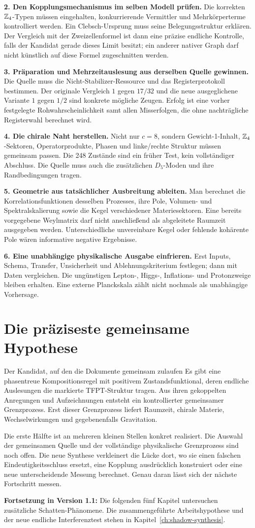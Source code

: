 \textbf{2. Den Kopplungsmechanismus im selben Modell prüfen.} Die korrekten $\mathbb Z_4$-Typen müssen eingehalten, konkurrierende Vermittler und Mehrkörperterme kontrolliert werden. Ein Clebsch-Ursprung muss seine Belegungsstruktur erklären. Der Vergleich mit der Zweizellenformel ist dann eine präzise endliche Kontrolle, falls der Kandidat gerade dieses Limit besitzt; ein anderer nativer Graph darf nicht künstlich auf diese Formel zugeschnitten werden.

\textbf{3. Präparation und Mehrzeitauslesung aus derselben Quelle gewinnen.} Die Quelle muss die Nicht-Stabilizer-Ressource und das Registerprotokoll bestimmen. Der originale Vergleich $1$ gegen $17/32$ und die neue ausgeglichene Variante $1$ gegen $1/2$ sind konkrete mögliche Zeugen. Erfolg ist eine vorher festgelegte Rohwahrscheinlichkeit samt allen Misserfolgen, die ohne nachträgliche Registerwahl berechnet wird.

\textbf{4. Die chirale Naht herstellen.} Nicht nur $c=8$, sondern Gewicht-1-Inhalt, $\mathbb Z_4$-Sektoren, Operatorprodukte, Phasen und linke/rechte Struktur müssen gemeinsam passen. Die 248 Zustände sind ein früher Test, kein vollständiger Abschluss. Die Quelle muss auch die zusätzlichen $D_5$-Moden und ihre Randbedingungen tragen.

\textbf{5. Geometrie aus tatsächlicher Ausbreitung ableiten.} Man berechnet die Korrelationsfunktionen desselben Prozesses, ihre Pole, Volumen- und Spektralskalierung sowie die Kegel verschiedener Materiesektoren. Eine bereits vorgegebene Weylmatrix darf nicht anschließend als abgeleitete Raumzeit ausgegeben werden. Unterschiedliche unvereinbare Kegel oder fehlende kohärente Pole wären informative negative Ergebnisse.

\textbf{6. Eine unabhängige physikalische Ausgabe einfrieren.} Erst Inputs, Schema, Transfer, Unsicherheit und Ablehnungskriterium festlegen; dann mit Daten vergleichen. Die ungünstigen Lepton-, Higgs-, Inflations- und Protonzweige bleiben erhalten. Eine externe Planckskala zählt nicht nochmals als unabhängige Vorhersage.

\section{Die präziseste gemeinsame Hypothese}
\begin{bild}{Der Kandidat, auf den die Dokumente gemeinsam zulaufen}
Es gibt eine phasentreue Kompositionsregel mit positivem Zustandsfunktional, deren endliche Auslesungen die markierte TFPT-Struktur tragen. Aus ihren gekoppelten Anregungen und Aufzeichnungen entsteht ein kontrollierter gemeinsamer Grenzprozess. Erst dieser Grenzprozess liefert Raumzeit, chirale Materie, Wechselwirkungen und gegebenenfalls Gravitation.
\end{bild}
Die erste Hälfte ist an mehreren kleinen Stellen konkret realisiert. Die Auswahl der gemeinsamen Quelle und der vollständige physikalische Grenzprozess sind noch offen. Die neue Synthese verkleinert die Lücke dort, wo sie einen falschen Eindeutigkeitsschluss ersetzt, eine Kopplung ausdrücklich konstruiert oder eine neue unterscheidende Messung berechnet. Genau daran lässt sich der nächste Fortschritt messen.

\par\noindent\textbf{Fortsetzung in Version 1.1:} Die folgenden fünf Kapitel untersuchen zusätzliche Schatten-Phänomene. Die zusammengeführte Arbeitshypothese und der neue endliche Interferenztest stehen in Kapitel~\ref{ch:shadow-synthesis}.
